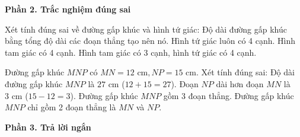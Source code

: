 \textbf{Phần 2. Trắc nghiệm đúng sai}

\begin{ex} %
Xét tính đúng sai về đường gấp khúc và hình tứ giác:
\choiceTF
{\True Độ dài đường gấp khúc bằng tổng độ dài các đoạn thẳng tạo nên nó.}
{\True Hình tứ giác luôn có 4 cạnh.}
{Hình tam giác có 4 cạnh.}
{\True Hình tam giác có 3 cạnh, hình tứ giác có 4 cạnh.}
\end{ex}

\begin{ex} %
Đường gấp khúc $MNP$ có $MN = 12\text{ cm}, NP = 15\text{ cm}$. Xét tính đúng sai:
\choiceTF
{\True Độ dài đường gấp khúc $MNP$ là $27\text{ cm}$ ($12 + 15 = 27$).}
{\True Đoạn $NP$ dài hơn đoạn $MN$ là $3\text{ cm}$ ($15 - 12 = 3$).}
{Đường gấp khúc $MNP$ gồm 3 đoạn thẳng.}
{\True Đường gấp khúc $MNP$ chỉ gồm 2 đoạn thẳng là $MN$ và $NP$.}
\end{ex}

\textbf{Phần 3. Trả lời ngắn}

